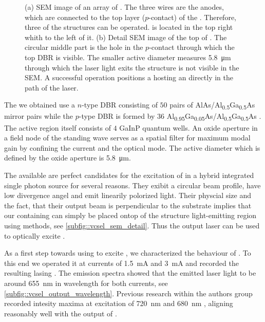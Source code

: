 \begin{figure}[htp]
\begin{subfigure}[t]{ 0.49\linewidth}
			\caption{}
			\label{subfig::vcsel_sem_detail}
		\end{subfigure}
		\caption[SEM image of an array of \VCSELs]{(a) SEM image of an array of \VCSELs. The three wires are the anodes, which are connected to the top layer ($p$-contact) of the \VCSEL. Therefore, three of the \VCSEL structures can be operated. \BmFour is located in the top right whith \BmTwo to the left of it. (b) Detail SEM image of the top of \BmFour. The circular middle part is the hole in the $p$-contact through which the top DBR is visible. The smaller active diameter measures \SI{5.8}{\micro\meter} through which the laser light exits the structure is not visible in the SEM. A successful \pp operation positions a \nd hosting an \siv directly in the path of the \VCSELs laser.}
	\end{figure}

	The \VCSELs we obtained use a $n$-type DBR consisting of $50$ pairs of AlAs/Al\textsubscript{0.5}Ga\textsubscript{0.5}As mirror pairs while the $p$-type DBR is formed by $36$ Al\textsubscript{0.95}Ga\textsubscript{0.05}As/Al\textsubscript{0.5}Ga\textsubscript{0.5}As \cite{Weidenfeld2012}. The active region itself consists of $4$ GaInP quantum wells. An oxide aperture in a field node of the standing wave serves as a spatial filter for maximum modal gain by confining the current and the optical mode. The active diameter which is defined by the oxide aperture is \SI{5.8}{\micro\meter}.

	The available \VCSELs are perfect candidates for the excitation of \sivs in a hybrid integrated single photon source for several reasons. They exibit a circular beam profile, have low divergence angel and emit linearily polorized light. Their physcial size and the fact, that their output beam is perpendicular to the substrate implies that our \nds containing \nds can simply be placed ontop of the structure light-emitting region using \pp methods, see \autoref{subfig::vcsel_sem_detail}. Thus the \VCSELs output laser can be used to optically excite \sivs.

	As a first step towards using \VCSELs to excite \ccs, we characterized the behaviour of \BmFour. To this end we operated it at currents of
	\SI{1.5}{\mA} and \SI{3}{\mA} and recorded the resulting lasing \wl. The emission spectra showed that the emitted \cw laser light to be around \SI{655}{\nm} in wavelength for both currents, see \autoref{subfig::vcsel_output_wavelength}. Previous research within the authors group recorded \siv intesity maxima at excitation \wls of \SI{720}{\nm} and \SI{680}{\nm} \cite{Incomplete master thesis of X}, aligning reasonably well with the output \wl of \BmFour.

